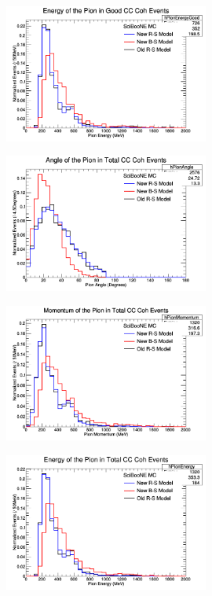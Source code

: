 \documentclass[11pt]{article}
\begin{document}
\begin{figure}[H]
\centering
\includegraphics[width=0.6\textwidth]{NMPionPlottingImages/9-NMPionPlotting.png}
\caption{}
\end{figure}

\begin{figure}[H]
\centering
\includegraphics[width=0.6\textwidth]{NMPionPlottingImages/10-NMPionPlotting.png}
\caption{}
\end{figure}

\begin{figure}[H]
\centering
\includegraphics[width=0.6\textwidth]{NMPionPlottingImages/11-NMPionPlotting.png}
\caption{}
\end{figure}

\begin{figure}[H]
\centering
\includegraphics[width=0.6\textwidth]{NMPionPlottingImages/12-NMPionPlotting.png}
\caption{}
\end{figure}
\end{document}
